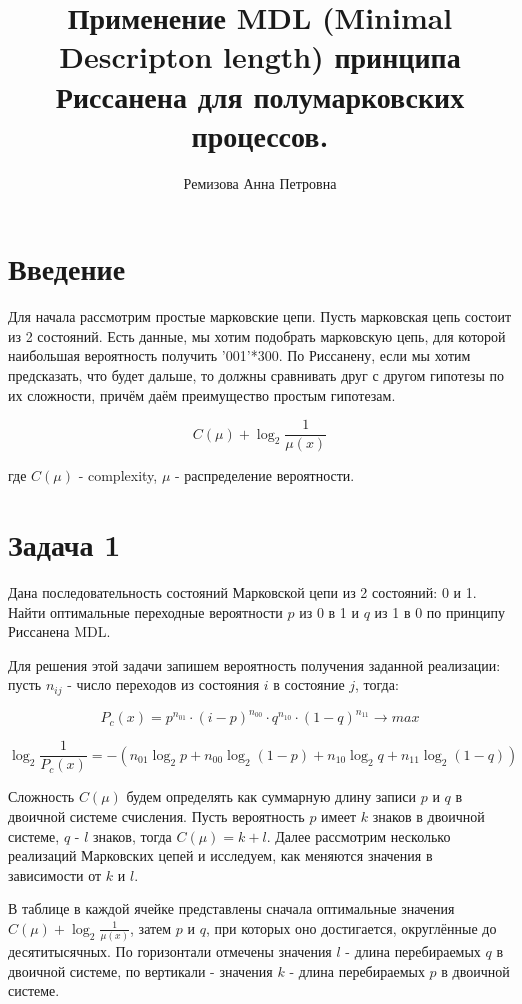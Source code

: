 \documentclass[12pt]{article}
\begin{document}
\title{Применение MDL (Minimal Descripton length) принципа Риссанена для полумарковских процессов.}
\author{Ремизова Анна Петровна}
\maketitle

\section*{Введение}
	Для начала рассмотрим простые марковские цепи. Пусть марковская цепь состоит из 2 состояний. Есть данные, мы хотим подобрать марковскую цепь, для которой наибольшая вероятность получить '001'*300. По Риссанену, если мы хотим предсказать, что будет дальше, то должны сравнивать друг с другом гипотезы по их сложности, причём даём преимущество простым гипотезам.
	
	$$C(\mu)+\log_2{\frac{1}{\mu(x)}}$$
	
	где $C(\mu)$ - complexity, $\mu$ - распределение вероятности.
	
\section*{Задача 1}
Дана последовательность состояний Марковской цепи из 2 состояний: 0 и 1. Найти оптимальные переходные вероятности $p$ из 0 в 1 и $q$ из 1 в 0 по принципу Риссанена MDL. 

Для решения этой задачи запишем вероятность получения заданной реализации: пусть $n_{ij}$ - число переходов из состояния $i$ в состояние $j$, тогда:

$$P_c(x) = p^{n_{01}}\cdot(i-p)^{n_{00}}\cdot q^{n_{10}}\cdot(1-q)^{n_{11}}\to max$$ 

$$\log_2{\frac{1}{P_c(x)}}=-(n_{01}\log_2{p}+n_{00}\log_2{(1-p)}+n_{10}\log_2{q}+n_{11}\log_2{(1-q)})$$

Сложность $C(\mu)$ будем определять как суммарную длину записи $p$ и $q$ в двоичной системе счисления. Пусть вероятность $p$ имеет $k$ знаков в двоичной системе, $q$ - $l$ знаков, тогда $C(\mu)=k+l$. Далее рассмотрим несколько реализаций Марковских цепей и исследуем, как меняются значения в зависимости от $k$ и $l$.

В таблице в каждой ячейке представлены сначала оптимальные значения $C(\mu)+\log_2{\frac{1}{\mu(x)}}$, затем $p$ и $q$, при которых оно достигается, округлённые до десятитысячных. По горизонтали отмечены значения $l$ - длина перебираемых $q$  в двоичной системе, по вертикали - значения $k$ - длина перебираемых $p$  в двоичной системе.
\end{document}
